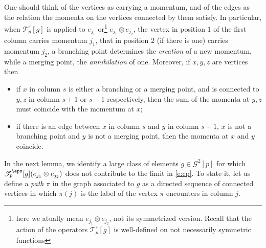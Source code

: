 \documentclass[reqno,11pt]{preprint}
\newcommand{\bj}{\mathbf{j}}
\newcommand{\cG}{\mathcal{G}}
\newcommand{\ST}{\mathscr{T}}
\newcommand{\1}{\mathds{1}}
\begin{document}
One should think of the vertices as carrying a momentum, and of the edges as the relation the 
momenta on the vertices connected by them satisfy. In particular, when $\ST^\varepsilon_p[g]$ is applied to  $e_{j_1}$ or\footnote{here we atually mean $e_{j_1}\otimes e_{j_2}$, not its symmetrized version. Recall that the action of the  operators $\mathcal T^\varepsilon_p[g]$ is well-defined on not necessarily symmetric functions} $e_{j_1}\otimes e_{j_2}$,
the vertex in position $1$ of the first column 
carries momentum $j_1$, that in position $2$ (if there is one) carries momentum $j_2$, a branching point determines 
the {\it creation} of a new momentum, while a merging point, the {\it annihilation} of one. Moreover, 
if $x,y,z$ are vertices then
\begin{itemize}[noitemsep]
\item if $x$ in column $s$ is either a branching or a merging point, and is connected to $y,z$ in column $s+1$ or $s-1$ respectively, then the sum of the momenta at $y,z$ must coincide with the momentum at $x$;  
\item if there is an edge between $x$ in column $s$ and $y$ in column $s+1$, $x$ is not a branching point and 
$y$ is not a merging point, then the momenta at $x$ and $y$ coincide. 
\end{itemize}
In the next lemma, we identify a large class of elements $g\in\cG^{2}[p]$ for which 
$\ST^\eps_p[g] (e_{j_1}\otimes e_{j_2})$ 
does not contribute to the limit  in \eqref{e:cp}. To state it, let us define a {\it path} $\pi$ in the graph associated to $g$ 
as a directed sequence of connected vertices in which $\pi(j)$ 
is the label of the vertex $\pi$ encounters in column $j$. 
%
%
%
\end{document}
